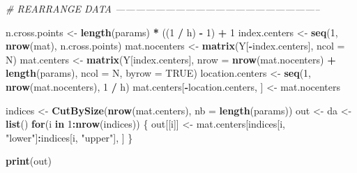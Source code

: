 \documentclass[11pt,]{article}
\newenvironment{Shaded}{\begin{snugshade}}{\end{snugshade}}
\newcommand{\CommentTok}[1]{\textcolor[rgb]{0.56,0.35,0.01}{\textit{#1}}}
\newcommand{\ControlFlowTok}[1]{\textcolor[rgb]{0.13,0.29,0.53}{\textbf{#1}}}
\newcommand{\DataTypeTok}[1]{\textcolor[rgb]{0.13,0.29,0.53}{#1}}
\newcommand{\DecValTok}[1]{\textcolor[rgb]{0.00,0.00,0.81}{#1}}
\newcommand{\KeywordTok}[1]{\textcolor[rgb]{0.13,0.29,0.53}{\textbf{#1}}}
\newcommand{\NormalTok}[1]{#1}
\newcommand{\OperatorTok}[1]{\textcolor[rgb]{0.81,0.36,0.00}{\textbf{#1}}}
\newcommand{\OtherTok}[1]{\textcolor[rgb]{0.56,0.35,0.01}{#1}}
\newcommand{\StringTok}[1]{\textcolor[rgb]{0.31,0.60,0.02}{#1}}
\begin{document}
\begin{Shaded}
\begin{Highlighting}[]
\CommentTok{# REARRANGE DATA --------------------------------------------------------------}

\NormalTok{n.cross.points <-}\StringTok{ }\KeywordTok{length}\NormalTok{(params) }\OperatorTok{*}\StringTok{ }\NormalTok{((}\DecValTok{1} \OperatorTok{/}\StringTok{ }\NormalTok{h) }\OperatorTok{-}\StringTok{ }\DecValTok{1}\NormalTok{) }\OperatorTok{+}\StringTok{ }\DecValTok{1}
\NormalTok{index.centers <-}\StringTok{ }\KeywordTok{seq}\NormalTok{(}\DecValTok{1}\NormalTok{, }\KeywordTok{nrow}\NormalTok{(mat), n.cross.points)}
\NormalTok{mat.nocenters <-}\StringTok{ }\KeywordTok{matrix}\NormalTok{(Y[}\OperatorTok{-}\NormalTok{index.centers], }\DataTypeTok{ncol =}\NormalTok{ N)}
\NormalTok{mat.centers <-}\StringTok{ }\KeywordTok{matrix}\NormalTok{(Y[index.centers], }
                      \DataTypeTok{nrow =} \KeywordTok{nrow}\NormalTok{(mat.nocenters) }\OperatorTok{+}\StringTok{ }\KeywordTok{length}\NormalTok{(params),}
                      \DataTypeTok{ncol =}\NormalTok{ N, }
                      \DataTypeTok{byrow =} \OtherTok{TRUE}\NormalTok{)}
\NormalTok{location.centers <-}\StringTok{ }\KeywordTok{seq}\NormalTok{(}\DecValTok{1}\NormalTok{, }\KeywordTok{nrow}\NormalTok{(mat.nocenters), }\DecValTok{1} \OperatorTok{/}\StringTok{ }\NormalTok{h)}
\NormalTok{mat.centers[}\OperatorTok{-}\NormalTok{location.centers, ] <-}\StringTok{ }\NormalTok{mat.nocenters}

\NormalTok{indices <-}\StringTok{ }\KeywordTok{CutBySize}\NormalTok{(}\KeywordTok{nrow}\NormalTok{(mat.centers), }\DataTypeTok{nb =} \KeywordTok{length}\NormalTok{(params))}
\NormalTok{out <-}\StringTok{ }\NormalTok{da <-}\StringTok{ }\KeywordTok{list}\NormalTok{()}
\ControlFlowTok{for}\NormalTok{(i }\ControlFlowTok{in} \DecValTok{1}\OperatorTok{:}\KeywordTok{nrow}\NormalTok{(indices)) \{}
\NormalTok{  out[[i]] <-}\StringTok{ }\NormalTok{mat.centers[indices[i, }\StringTok{"lower"}\NormalTok{]}\OperatorTok{:}\NormalTok{indices[i, }\StringTok{"upper"}\NormalTok{], ]}
\NormalTok{\}}

\KeywordTok{print}\NormalTok{(out)}
\end{Highlighting}
\end{Shaded}
\end{document}
